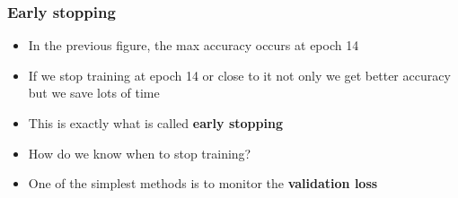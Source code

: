 \documentclass{beamer}
\begin{document}
\begin{frame}
    \frametitle{Early stopping}
    \begin{itemize}
        \item In the previous figure, the max accuracy occurs at epoch 14
        \item If we stop training at epoch 14 or close to it not only we get better accuracy but we save lots of time 
        \item This is exactly what is called \textbf{early stopping}
        \item How do we know when to stop training?
        \item One of the simplest methods is to monitor the \textbf{validation loss}
    \end{itemize}
    

\end{frame}
\end{document}
